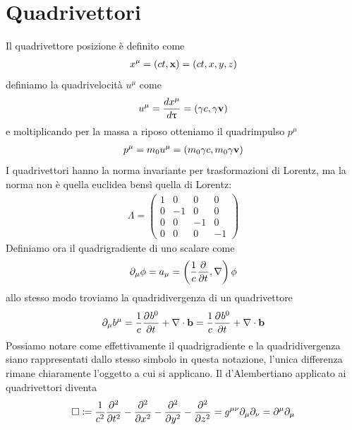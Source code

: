 \section{Quadrivettori}
Il quadrivettore posizione è definito come
\begin{align}
  x^\mu = (ct, \v{x}) = (ct, x, y, z)
\end{align}
definiamo la quadrivelocità $ u^\mu $ come
\begin{align}
  u^\mu = \frac{dx^\mu}{d\uptau} = (\gamma c, \gamma \v{ v })
\end{align}
e moltiplicando per la massa a riposo otteniamo il quadrimpulso $ p^\mu $ 
\begin{align}
  p^\mu = m_0 u^\mu = (m_0 \gamma c, m_0 \gamma \v{ v })
\end{align}
I quadrivettori hanno la norma invariante per trasformazioni di Lorentz, ma la norma non è quella euclidea bensì quella di Lorentz:
\begin{align}
  \Lambda = 
  \begin{pmatrix}
    1 & 0 & 0 & 0 \\
    0 & -1 & 0 & 0 \\
    0 & 0 & -1 & 0 \\
    0 & 0 & 0 & -1 
  \end{pmatrix}
\end{align}
Definiamo ora il quadrigradiente di uno scalare come 
\begin{align}
  \partial_\mu \phi = a_\mu = \left( \frac{1}{c} \der{}{t}, \nabla  \right) \phi
\end{align}
allo stesso modo troviamo la quadridivergenza di un quadrivettore
\begin{align}
  \partial_\mu b^\mu = \frac{1}{c} \der{b^0}{t} + \nabla \cdot \v{ b } = \frac{1}{c} \der{b^0}{t} + \nabla \cdot \v{ b }
\end{align}
Possiamo notare come effettivamente il quadrigradiente e la quadridivergenza siano rappresentati dallo stesso simbolo in questa notazione, l'unica 
differenza rimane chiaramente l'oggetto a cui si applicano. Il d'Alembertiano applicato ai quadrivettori diventa
\begin{align}
  \Box \coloneq \frac{1}{c^2} \der[2]{}{t} - \der[2]{}{x} - \der[2]{}{y} - \der[2]{}{z} = g^{\mu \nu} \partial_\mu \partial_\nu = \partial^\mu \partial_\mu
\end{align}

